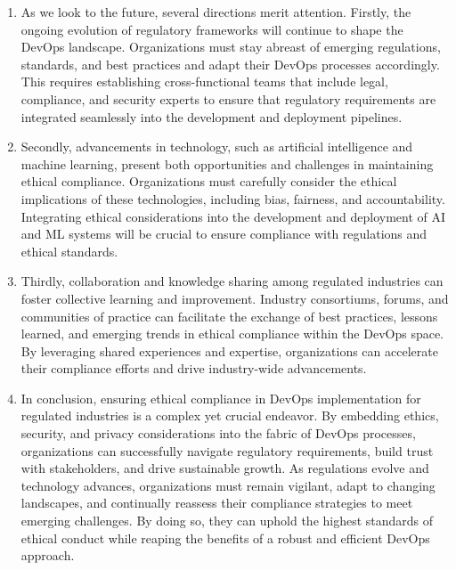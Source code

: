 \begin{enumerate}
    \item As we look to the future, several directions merit attention. Firstly, the ongoing evolution of regulatory frameworks will continue to shape the DevOps landscape. Organizations must stay abreast of emerging regulations, standards, and best practices and adapt their DevOps processes accordingly. This requires establishing cross-functional teams that include legal, compliance, and security experts to ensure that regulatory requirements are integrated seamlessly into the development and deployment pipelines.

    \item Secondly, advancements in technology, such as artificial intelligence and machine learning, present both opportunities and challenges in maintaining ethical compliance. Organizations must carefully consider the ethical implications of these technologies, including bias, fairness, and accountability. Integrating ethical considerations into the development and deployment of AI and ML systems will be crucial to ensure compliance with regulations and ethical standards.

    \item Thirdly, collaboration and knowledge sharing among regulated industries can foster collective learning and improvement. Industry consortiums, forums, and communities of practice can facilitate the exchange of best practices, lessons learned, and emerging trends in ethical compliance within the DevOps space. By leveraging shared experiences and expertise, organizations can accelerate their compliance efforts and drive industry-wide advancements.

    \item In conclusion, ensuring ethical compliance in DevOps implementation for regulated industries is a complex yet crucial endeavor. By embedding ethics, security, and privacy considerations into the fabric of DevOps processes, organizations can successfully navigate regulatory requirements, build trust with stakeholders, and drive sustainable growth. As regulations evolve and technology advances, organizations must remain vigilant, adapt to changing landscapes, and continually reassess their compliance strategies to meet emerging challenges. By doing so, they can uphold the highest standards of ethical conduct while reaping the benefits of a robust and efficient DevOps approach.

\end{enumerate}